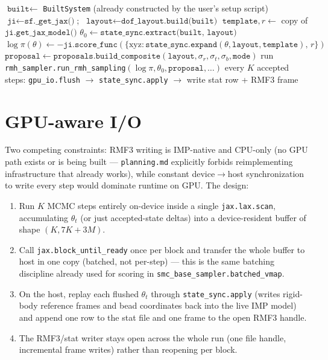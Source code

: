 \documentclass[11pt]{article}
\begin{document}
\begin{algorithm}[h]
\caption{\texttt{wrapper\_impjax.run\_sampling} (single-mode RMH; SMC-tempered variant reuses the same $\log\pi$/proposal and calls \texttt{smc\_base\_sampler.py} instead)}
\begin{algorithmic}[1]
\State $\texttt{built} \gets$ \texttt{BuiltSystem} (already constructed by the user's setup script)
\State $\texttt{ji} \gets \texttt{sf.\_get\_jax()}$; $\ \texttt{layout} \gets \texttt{dof\_layout.build(built)}$
\State $\texttt{template}, r \gets$ copy of $\texttt{ji.get\_jax\_model()}$ 
\State $\theta_0 \gets \texttt{state\_sync.extract(built, layout)}$
\State $\log\pi(\theta) \gets -\texttt{ji.score\_func}(\{\text{xyz}: \texttt{state\_sync.expand}(\theta, \texttt{layout}, \texttt{template}),\, r\})$
\State $\texttt{proposal} \gets \texttt{proposals.build\_composite}(\texttt{layout}, \sigma_r, \sigma_t, \sigma_b, \texttt{mode})$
\State run \texttt{rmh\_sampler.run\_rmh\_sampling}$(\log\pi, \theta_0, \texttt{proposal}, \dots)$ 
\State every $K$ accepted steps: \texttt{gpu\_io.flush} $\to$ \texttt{state\_sync.apply} $\to$ write stat row + RMF3 frame
\end{algorithmic}
\end{algorithm}

\section{GPU-aware I/O}
\label{sec:io}

Two competing constraints: RMF3 writing is IMP-native and CPU-only (no GPU
path exists or is being built --- \texttt{planning.md} explicitly forbids
reimplementing infrastructure that already works), while constant
device$\to$host synchronization to write every step would dominate runtime on
GPU. The design:

\begin{enumerate}
  \item Run $K$ MCMC steps entirely on-device inside a single
    \texttt{jax.lax.scan}, accumulating $\theta_t$ (or just accepted-state
    deltas) into a device-resident buffer of shape $(K, 7K{+}3M)$.
  \item Call \texttt{jax.block\_until\_ready} once per block and transfer the
    whole buffer to host in one copy (batched, not per-step) --- this is the
    same batching discipline already used for scoring in
    \texttt{smc\_base\_sampler.batched\_vmap}.
  \item On the host, replay each flushed $\theta_t$ through
    \texttt{state\_sync.apply} (writes rigid-body reference frames and bead
    coordinates back into the live IMP model) and append one row to the stat
    file and one frame to the open RMF3 handle.
  \item The RMF3/stat writer stays open across the whole run (one file
    handle, incremental frame writes) rather than reopening per block.
\end{enumerate}
\end{document}
